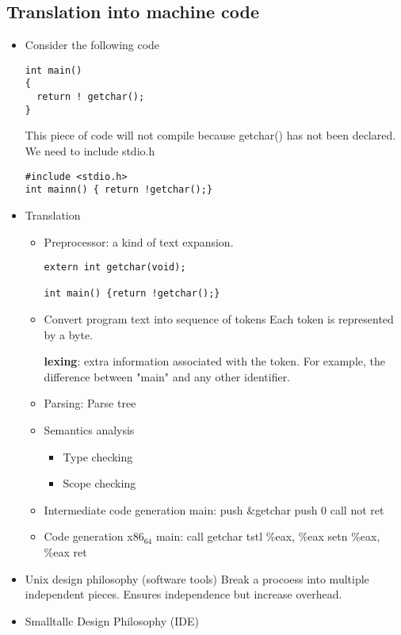 \documentclass[11pt]{article}
\begin{document}
\subsection{Translation into machine code}
\label{sec:org6a4769d}
\begin{itemize}
\item Consider the following code
\begin{verbatim}
int main()
{
  return ! getchar();
}
\end{verbatim}
This piece of code will not compile because getchar() has not been
declared. We need to include stdio.h

\begin{verbatim}
#include <stdio.h>
int mainn() { return !getchar();}
\end{verbatim}

\item Translation
\begin{itemize}
\item Preprocessor: a kind of text expansion.
\begin{verbatim}
extern int getchar(void);

int main() {return !getchar();}
\end{verbatim}

\item Convert program text into sequence of tokens
Each token is represented by a byte.

\textbf{lexing}: extra information associated with the token. For example, the
difference between "main" and any other identifier.

\item Parsing: Parse tree
\item Semantics analysis
\begin{itemize}
\item Type checking
\item Scope checking
\end{itemize}
\item Intermediate code generation
main:
     push \&getchar
     push 0
     call 
     not
     ret
\item Code generation x86\(_{\text{64}}\)
main:
     call getchar
     tstl \%eax, \%eax
     setn \%eax, \%eax
     ret
\end{itemize}

\item Unix design philosophy (software tools)
Break a procoess into multiple independent pieces.
Ensures independence but increase overhead.

\item Smalltallc Design Philosophy (IDE)
\end{itemize}
\end{document}
